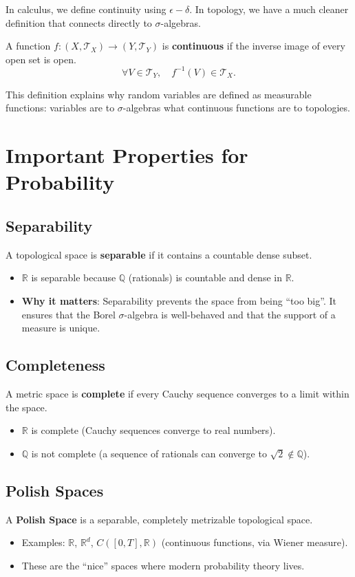 In calculus, we define continuity using $\epsilon-\delta$. In topology, we have a much cleaner definition that connects directly to $\sigma$-algebras.

\begin{definition}
A function $f: (X, \mathcal{T}_X) \to (Y, \mathcal{T}_Y)$ is \textbf{continuous} if the inverse image of every open set is open.
\[
\forall V \in \mathcal{T}_Y, \quad f^{-1}(V) \in \mathcal{T}_X.
\]
\end{definition}
This definition explains why random variables are defined as measurable functions: variables are to $\sigma$-algebras what continuous functions are to topologies.

\section{Important Properties for Probability}

\subsection{Separability}
A topological space is \textbf{separable} if it contains a countable dense subset.
\begin{itemize}
    \item $\mathbb{R}$ is separable because $\mathbb{Q}$ (rationals) is countable and dense in $\mathbb{R}$.
    \item \textbf{Why it matters}: Separability prevents the space from being ``too big''. It ensures that the Borel $\sigma$-algebra is well-behaved and that the support of a measure is unique.
\end{itemize}

\subsection{Completeness}
A metric space is \textbf{complete} if every Cauchy sequence converges to a limit within the space.
\begin{itemize}
    \item $\mathbb{R}$ is complete (Cauchy sequences converge to real numbers).
    \item $\mathbb{Q}$ is not complete (a sequence of rationals can converge to $\sqrt{2} \notin \mathbb{Q}$).
\end{itemize}

\subsection{Polish Spaces}
A \textbf{Polish Space} is a separable, completely metrizable topological space.
\begin{itemize}
    \item Examples: $\mathbb{R}$, $\mathbb{R}^d$, $C([0, T], \mathbb{R})$ (continuous functions, via Wiener measure).
    \item These are the ``nice'' spaces where modern probability theory lives.
\end{itemize}


